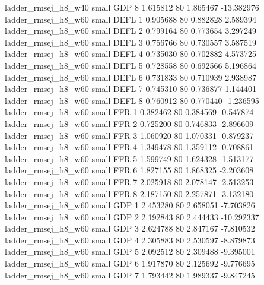      ladder_rmsej_h8_w40      small      GDP                 8 1.615812 80       1.865467         -13.382976
     ladder_rmsej_h8_w60      small     DEFL                 1 0.905688 80       0.882828           2.589394
     ladder_rmsej_h8_w60      small     DEFL                 2 0.799164 80       0.773654           3.297249
     ladder_rmsej_h8_w60      small     DEFL                 3 0.756766 80       0.730557           3.587519
     ladder_rmsej_h8_w60      small     DEFL                 4 0.735030 80       0.702882           4.573725
     ladder_rmsej_h8_w60      small     DEFL                 5 0.728558 80       0.692566           5.196864
     ladder_rmsej_h8_w60      small     DEFL                 6 0.731833 80       0.710939           2.938987
     ladder_rmsej_h8_w60      small     DEFL                 7 0.745310 80       0.736877           1.144401
     ladder_rmsej_h8_w60      small     DEFL                 8 0.760912 80       0.770440          -1.236595
     ladder_rmsej_h8_w60      small      FFR                 1 0.382462 80       0.384569          -0.547874
     ladder_rmsej_h8_w60      small      FFR                 2 0.725200 80       0.746833          -2.896609
     ladder_rmsej_h8_w60      small      FFR                 3 1.060920 80       1.070331          -0.879237
     ladder_rmsej_h8_w60      small      FFR                 4 1.349478 80       1.359112          -0.708861
     ladder_rmsej_h8_w60      small      FFR                 5 1.599749 80       1.624328          -1.513177
     ladder_rmsej_h8_w60      small      FFR                 6 1.827155 80       1.868325          -2.203608
     ladder_rmsej_h8_w60      small      FFR                 7 2.025918 80       2.078147          -2.513253
     ladder_rmsej_h8_w60      small      FFR                 8 2.187150 80       2.257871          -3.132180
     ladder_rmsej_h8_w60      small      GDP                 1 2.453280 80       2.658051          -7.703826
     ladder_rmsej_h8_w60      small      GDP                 2 2.192843 80       2.444433         -10.292337
     ladder_rmsej_h8_w60      small      GDP                 3 2.624788 80       2.847167          -7.810532
     ladder_rmsej_h8_w60      small      GDP                 4 2.305883 80       2.530597          -8.879873
     ladder_rmsej_h8_w60      small      GDP                 5 2.092512 80       2.309488          -9.395001
     ladder_rmsej_h8_w60      small      GDP                 6 1.917870 80       2.125692          -9.776695
     ladder_rmsej_h8_w60      small      GDP                 7 1.793442 80       1.989337          -9.847245
